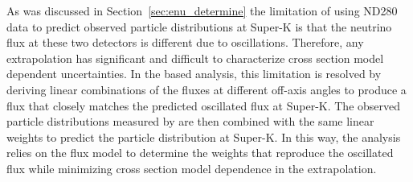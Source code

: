 
As was discussed in Section~\ref{sec:enu_determine} the limitation of using ND280 data to predict observed particle distributions at Super-K is that the neutrino flux at these two detectors is different due to oscillations.  Therefore, any extrapolation has significant and difficult to characterize cross section model dependent uncertainties.  In the \nuprismlite based analysis, this limitation is resolved by deriving linear combinations of the fluxes at different off-axis angles to produce a flux that closely matches the predicted oscillated flux at Super-K.  The observed particle distributions measured by \nuprismlite are then combined with the same linear weights to predict the particle distribution at Super-K.  In this way, the analysis relies on the flux model to determine the weights that reproduce the oscillated flux while minimizing cross section model dependence in the extrapolation.

